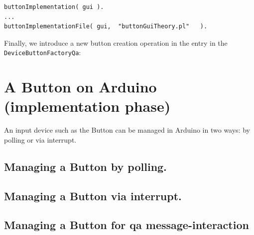 \begin{lstlisting}
buttonImplementation( gui ).
...
buttonImplementationFile( gui,  "buttonGuiTheory.pl"   ).
\end{lstlisting}

Finally, we introduce a new button creation operation in the entry in the \texttt{DeviceButtonFactoryQa}:



\newpage 
\section{A Button on Arduino (implementation phase)}

An input device such as the Button can be managed in Arduino in two ways: by polling or via interrupt. 

\subsection{Managing a Button by polling.\\} 

 

\subsection{Managing a Button via interrupt.\\} 

 

\subsection{Managing a Button for qa message-interaction\\} 

 

